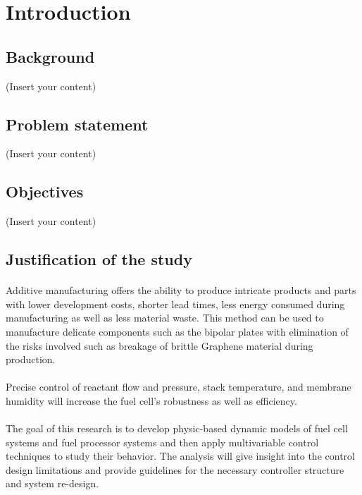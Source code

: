 \section{Introduction}
\subsection{Background}
(Insert your content)
\subsection{Problem statement}
(Insert your content)
\subsection{Objectives}
(Insert your content)
\subsection{Justification of the study}
\paragraph{}Additive manufacturing offers the ability to produce intricate products and parts with lower development costs, shorter lead times, less energy consumed during manufacturing as well as less material waste. This method can be used to manufacture delicate components such as the bipolar plates with elimination of the risks involved such as breakage of brittle Graphene material during production.     
\paragraph{}Precise control of reactant flow and pressure, stack temperature, and membrane humidity will increase the fuel cell’s robustness as well as efficiency.
\paragraph{}The goal of this research is to develop physic-based dynamic models of fuel cell systems and fuel processor systems and then apply multivariable control techniques to study their behavior. The analysis will give insight into the control design limitations and provide guidelines for the necessary controller structure and system re-design.
